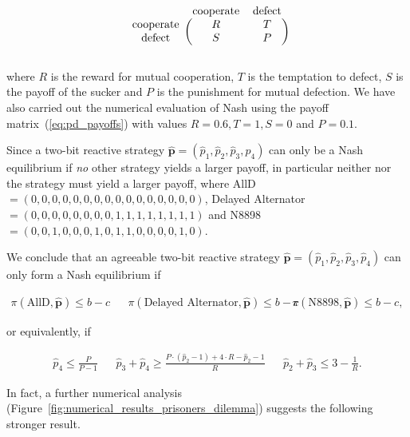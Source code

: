 \documentclass{article}
\theoremstyle{definition}
\begin{document}
\begin{equation}\label{eq:pd_payoffs}
  \begin{blockarray}{ccc}
      & \text{cooperate} & \text{defect} \\
      \begin{block}{c(cc)}
          \text{cooperate} & R & T \\
          \text{defect} & S & P \\
      \end{block}
  \end{blockarray}
\end{equation}

where \(R\) is the reward for mutual cooperation, \(T\) is the temptation to
defect, \(S\) is the payoff of the sucker and \(P\) is the punishment for mutual
defection. We have also carried out the numerical evaluation of Nash using the
payoff matrix~(\ref{eq:pd_payoffs}) with values \(R=0.6, T=1, S=0\) and
\(P=0.1\).

Since a two-bit reactive strategy \(\mathbf{\hat{p}} = (\hat{p}_{1},
\hat{p}_{2}, \hat{p}_{3}, \hat{p}_{4})\) can only be a Nash equilibrium if {\it
no} other strategy yields a larger payoff, in particular neither 
nor the  strategy must yield a larger payoff, where AllD\(=(0,
0, 0, 0, 0, 0, 0, 0, 0, 0, 0, 0, 0, 0, 0, 0)\), Delayed Alternator\(=(0, 0, 0,
0, 0, 0, 0, 0, 1, 1, 1, 1, 1, 1, 1, 1)\) and N8898\(=(0, 0, 1, 0, 0, 0, 1, 0, 1,
1, 0, 0, 0, 0, 1, 0)\).

We conclude that an agreeable two-bit reactive strategy  \(\mathbf{\hat{p}} =
(\hat{p}_{1}, \hat{p}_{2}, \hat{p}_{3}, \hat{p}_{4})\) can only form a Nash
equilibrium if

\begin{align*}
\pi(\text{AllD}, \mathbf{\hat{p}}) \leq b\!-\!c & & \pi(\text{Delayed Alternator}, \mathbf{\hat{p}}) \leq b\!-\!c & & \pi(\text{N8898}, \mathbf{\hat{p}}) \leq b\!-\!c,
\end{align*}

or equivalently, if

\begin{align}\label{Eq:NashConditionDonationGamePD}
  \hat{p}_4 \leq \frac{P}{P - 1} & & \hat{p}_3 + \hat{p}_4 \geq \frac{P \cdot (\hat{p}_2 - 1) + 4 \cdot R - \hat{p}_2 - 1}{R} &  &  \hat{p}_2 + \hat{p}_3 \leq 3 - \frac{1}{R}.
\end{align}

In fact, a further numerical analysis (Figure~\ref{fig:numerical_results_prisoners_dilemma}) suggests the following stronger result. 
\end{document}
